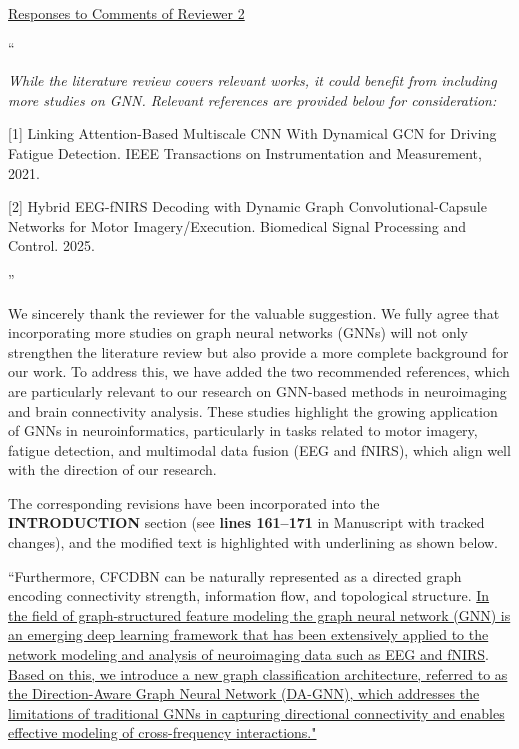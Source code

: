 \documentclass[12pt,technote,onecolumn]{IEEEtran}
\begin{document}
\newpage
\clearpage
\begin{center}
\underline{Responses to Comments of Reviewer 2}
\end{center}
\vspace{3mm}

 ``{\it While the literature review covers relevant works, it could benefit from including more studies on GNN. Relevant references are provided below for consideration:

[1] Linking Attention-Based Multiscale CNN With Dynamical GCN for Driving Fatigue Detection. IEEE Transactions on Instrumentation and Measurement, 2021.

[2] Hybrid EEG-fNIRS Decoding with Dynamic Graph Convolutional-Capsule Networks for Motor Imagery/Execution. Biomedical Signal Processing and Control. 2025.}''
\vspace{1mm}


We sincerely thank the reviewer for the valuable suggestion. We fully agree that incorporating more studies on graph neural networks (GNNs) will not only strengthen the literature review but also provide a more complete background for our work. To address this, we have added the two recommended references, which are particularly relevant to our research on GNN-based methods in neuroimaging and brain connectivity analysis. These studies highlight the growing application of GNNs in neuroinformatics, particularly in tasks related to motor imagery, fatigue detection, and multimodal data fusion (EEG and fNIRS), which align well with the direction of our research.

The corresponding revisions have been incorporated into the \textbf{INTRODUCTION} section (see \textbf{lines 161–171} in Manuscript with tracked changes), and the modified text is highlighted with underlining as shown below.

``Furthermore, CFCDBN can be naturally represented as a directed graph encoding connectivity strength, information flow, and topological structure.
\uline{In the field of graph-structured feature modeling the graph neural network (GNN) is an emerging deep learning framework that has been extensively applied to the network modeling and analysis of neuroimaging data such as EEG and fNIRS}\cite{wang2020linking,wang2025hybrid}.  \uline{Based on this, we introduce a new graph classification architecture, referred to as the Direction-Aware Graph Neural Network (DA-GNN), which addresses the limitations of traditional GNNs in capturing directional connectivity and enables effective modeling of cross-frequency interactions."} 
\end{document}
